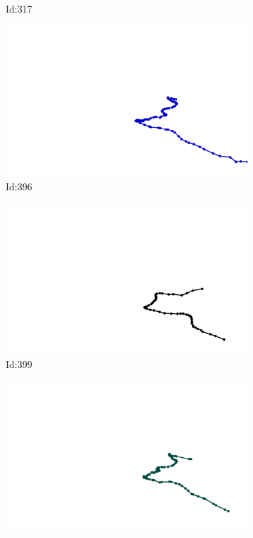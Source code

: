 \documentclass[12pt,twoside]{report}
\begin{document}
\begin{figure}
\begin{subfigure}[b]{0.20\textwidth}
\caption{Id:317}
\end{subfigure}
\begin{subfigure}[b]{0.20\textwidth}
\centering
\includegraphics[width=\textwidth]{../../trajectories/396.png}
\caption{Id:396}
\end{subfigure}
\begin{subfigure}[b]{0.20\textwidth}
\centering
\includegraphics[width=\textwidth]{../../trajectories/399.png}
\caption{Id:399}
\end{subfigure}
\begin{subfigure}[b]{0.20\textwidth}
\centering
\includegraphics[width=\textwidth]{../../trajectories/430.png}

\end{subfigure}
\end{figure}
\end{document}
